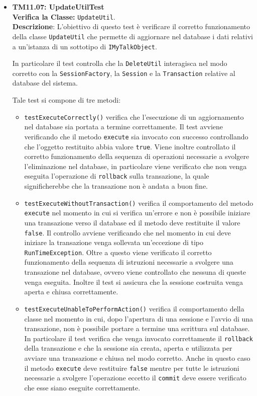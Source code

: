 \begin{itemize}
\item \textbf{TM11.07: UpdateUtilTest}\\
\textbf{Verifica la Classe:} \texttt{UpdateUtil}.\\
\textbf{Descrizione}: L'obiettivo di questo test è verificare il corretto funzionamento della classe \texttt{UpdateUtil} che permette di aggiornare nel database i dati relativi a un'istanza di un sottotipo di \texttt{IMyTalkObject}.

In particolare il test controlla che la \texttt{DeleteUtil} interagisca nel modo corretto con la \texttt{SessionFactory}, la \texttt{Session} e la \texttt{Transaction} relative al database del sistema.

Tale test si compone di tre metodi:
\begin{itemize}
\item \texttt{testExecuteCorrectly()} verifica che l'esecuzione di un aggiornamento nel database sia portata a termine correttamente. Il test avviene verificando che il metodo \texttt{execute} sia invocato con successo controllando che l'oggetto restituito abbia valore \texttt{true}. Viene inoltre controllato il corretto funzionamento della sequenza di operazioni necessarie a svolgere l'eliminazione nel database, in particolare viene verificato che non venga eseguita l'operazione di \texttt{rollback} sulla transazione, la quale significherebbe che la transazione non è andata a buon fine.

\item \texttt{testExecuteWithoutTransaction()}  verifica il comportamento del metodo \\ \texttt{execute} nel momento in cui si verifica un'errore e non è possibile iniziare una transazione verso il database ed il metodo deve restituite il valore \texttt{false}. Il controllo avviene verificando che nel momento in cui deve iniziare la transazione venga sollevata un'eccezione di tipo \texttt{RunTimeException}. Oltre a questo viene verificato il corretto funzionamento della sequenza di istruzioni necessarie a svolgere una transazione nel database, ovvero viene controllato che nessuna di queste venga eseguita. Inoltre il test si assicura che la sessione costruita venga aperta e chiusa correttamente.

\item \texttt{testExecuteUnableToPerformAction()} verifica il comportamento della classe nel momento in cui, dopo l'apertura di una sessione e l'avvio di una transazione, non è possibile portare a termine una scrittura sul database. In particolare il test verifica che venga invocato correttamente il \texttt{rollback} della transazione e che la sessione sia creata, aperta e utilizzata per avviare una transazione e chiusa nel modo corretto. Anche in questo caso il metodo \texttt{execute} deve restituire \texttt{false} mentre per tutte le istruzioni necessarie a svolgere l'operazione eccetto il \texttt{commit} deve essere verificato che esse siano eseguite correttamente.


\end{itemize}
\end{itemize}
